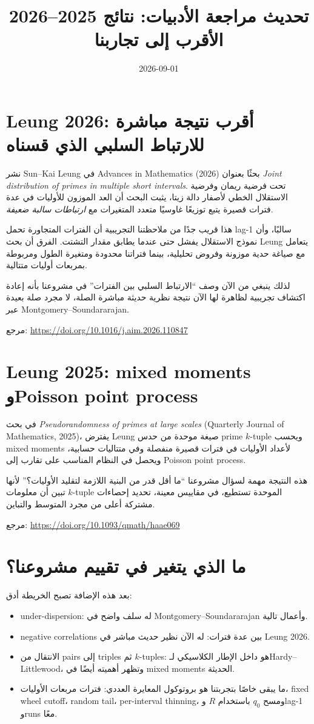 \documentclass[12pt]{article}
\title{تحديث مراجعة الأدبيات: نتائج 2025--2026 الأقرب إلى تجاربنا}
\date{2026-09-01}
\begin{document}
\maketitle

\section{Leung 2026: أقرب نتيجة مباشرة للارتباط السلبي الذي قسناه}
نشر Sun--Kai Leung في Advances in Mathematics (2026) بحثًا بعنوان
\emph{Joint distribution of primes in multiple short intervals}.
تحت فرضية ريمان وفرضية الاستقلال الخطي لأصفار دالة زيتا، يثبت البحث أن العد الموزون للأوليات في عدة فترات قصيرة يتبع توزيعًا غاوسيًا متعدد المتغيرات مع \emph{ارتباطات سالبة ضعيفة}.

هذا قريب جدًا من ملاحظتنا التجريبية أن الفترات المتجاورة تحمل lag-1 سالبًا، وأن نموذج الاستقلال يفشل حتى عندما يطابق مقدار التشتت. الفرق أن بحث Leung يتعامل مع صياغة حدية موزونة وفروض تحليلية، بينما فتراتنا محدودة ومتغيرة الطول ومربوطة بمربعات أوليات متتالية.

لذلك ينبغي من الآن وصف ``الارتباط السلبي بين الفترات'' في مشروعنا بأنه إعادة اكتشاف تجريبية لظاهرة لها الآن نتيجة نظرية حديثة مباشرة الصلة، لا مجرد صلة بعيدة عبر Montgomery--Soundararajan.

مرجع:
\url{https://doi.org/10.1016/j.aim.2026.110847}

\section{Leung 2025: mixed moments وPoisson point process}
في بحث \emph{Pseudorandomness of primes at large scales} (Quarterly Journal of Mathematics, 2025)، يفترض Leung صيغة موحدة من حدس prime $k$-tuple ويحسب mixed moments لأعداد الأوليات في فترات قصيرة منفصلة وفي متتاليات حسابية، ويحصل في النظام المناسب على تقارب إلى Poisson point process.

هذه النتيجة مهمة لسؤال مشروعنا ``ما أقل قدر من البنية اللازمة لتقليد الأوليات؟'' لأنها تبين أن معلومات $k$-tuple الموحدة تستطيع، في مقاييس معينة، تحديد إحصاءات مشتركة أعلى من مجرد المتوسط والتباين.

مرجع:
\url{https://doi.org/10.1093/qmath/haae069}

\section{ما الذي يتغير في تقييم مشروعنا؟}
بعد هذه الإضافة تصبح الخريطة أدق:

\begin{itemize}
\item under-dispersion: له سلف واضح في Montgomery--Soundararajan وأعمال تالية.
\item negative correlations بين عدة فترات: له الآن نظير حديث مباشر في Leung 2026.
\item الانتقال من pairs إلى triples ثم $k$-tuples: هو داخل الإطار الكلاسيكي لـHardy--Littlewood، وتظهر أهميته أيضًا في mixed moments الحديثة.
\item ما يبقى خاصًا بتجربتنا هو بروتوكول المعايرة العددي: فترات مربعات الأوليات، fixed wheel cutoff، random tail، per-interval thinning، ومسح $q_0$ باستخدام $R$ وlag-1 وruns معًا.
\end{itemize}
\end{document}
